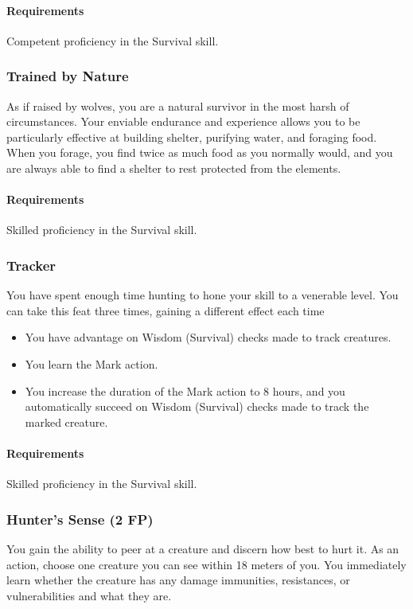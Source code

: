     \paragraph{Requirements} Competent proficiency in the Survival skill.
\subsubsection{Trained by Nature} \label{feat::trainedbynature}
    As if raised by wolves, you are a natural survivor in the most harsh of circumstances.
    Your enviable endurance and experience allows you to be particularly effective at building shelter, purifying water, and foraging food.
    When you forage, you find twice as much food as you normally would, and you are always able to find a shelter to rest protected from the elements.
    \paragraph{Requirements} Skilled proficiency in the Survival skill.
\subsubsection{Tracker} \label{feat::tracker}
    You have spent enough time hunting to hone your skill to a venerable level.
    You can take this feat three times, gaining a different effect each time
    \begin{itemize}
        \item You have advantage on Wisdom (Survival) checks made to track creatures.
        \item You learn the Mark action.
        \item You increase the duration of the Mark action to 8 hours, and you automatically succeed on Wisdom (Survival) checks made to track the marked creature.
    \end{itemize}
    \paragraph{Requirements} Skilled proficiency in the Survival skill.
\subsubsection{Hunter's Sense (2 FP)} \label{feat::hunterssense}
    You gain the ability to peer at a creature and discern how best to hurt it.
    As an action, choose one creature you can see within 18 meters of you.
    You immediately learn whether the creature has any damage immunities, resistances, or vulnerabilities and what they are.

